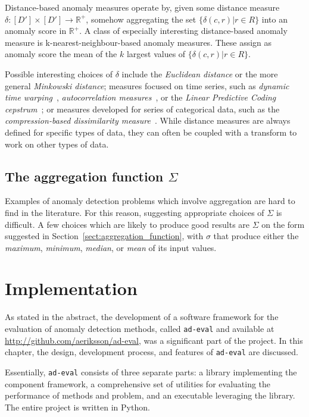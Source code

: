 Distance-based anomaly measures operate by, given some distance measure $\delta: [D'] \times [D'] \rightarrow \mathbb{R}^+$, somehow aggregating the set $\{\delta(c, r) | r \in R\}$ into an anomaly score in $\mathbb{R}^+$. A class of especially interesting distance-based anomaly measure is k-nearest-neighbour-based anomaly measures. These assign as anomaly score the mean of the $k$ largest values of $\{\delta(c, r) | r \in R\}$.

Possible interesting choices of $\delta$ include the \emph{Euclidean distance} or the more general \emph{Minkowski distance}; measures focused on time series, such as \emph{dynamic time warping}~\cite{dtw}, \emph{autocorrelation measures}~\cite{autocorrelation}, or the \emph{Linear Predictive Coding cepstrum}~\cite{cepstrum}; or measures developed for series of categorical data, such as the \emph{compression-based dissimilarity measure}~\cite{keogh2}. While distance measures are always defined for specific types of data, they can often be coupled with a transform to work on other types of data.

\subsection{The aggregation function $\Sigma$}

Examples of anomaly detection problems which involve aggregation are hard to find in the literature. For this reason, suggesting appropriate choices of $\Sigma$ is difficult. A few choices which are likely to produce good results are $\Sigma$ on the form suggested in Section~\ref{sect:aggregation_function}, with $\sigma$ that produce either the \emph{maximum}, \emph{minimum}, \emph{median}, or \emph{mean} of its input values.

\section{Implementation}
\label{ch:implementation}

As stated in the abstract, the development of a software framework for the evaluation of anomaly detection methods, called \texttt{ad-eval} and available at \url{http://github.com/aeriksson/ad-eval}, was a significant part of the project. In this chapter, the design, development process, and features of \texttt{ad-eval} are discussed.

Essentially, \texttt{ad-eval} consists of three separate parts: a library implementing the component framework, a comprehensive set of utilities for evaluating the performance of methods and problem, and an executable leveraging the library. The entire project is written in Python.

